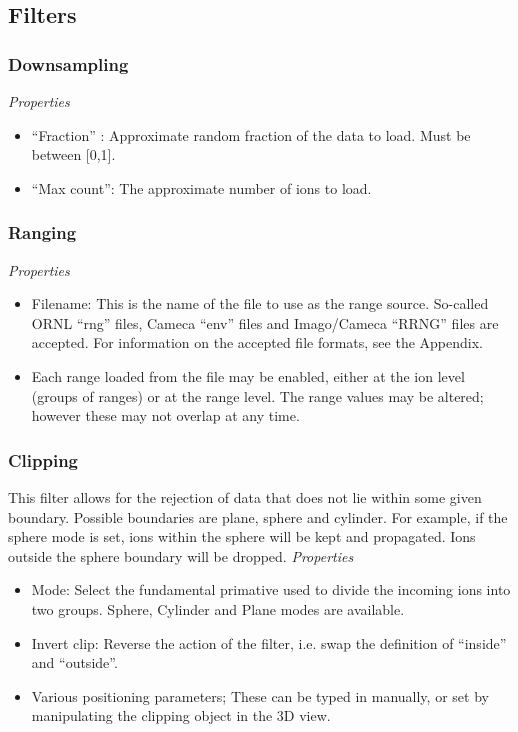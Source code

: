 \documentclass[10pt]{article}
\begin{document}
{\subsection{Filters}
\subsubsection{Downsampling}

\emph{Properties}
\begin{itemize}
\item  ``Fraction'' : Approximate random fraction of the data to load. Must be between [0,1].
\item  ``Max count'': The approximate number of ions to load.

\end{itemize}
 
\subsubsection{Ranging}
 
\emph{Properties}
\begin{itemize}
\item Filename: This is the name of the file to use as the range source. So-called ORNL ``rng'' files, Cameca ``env'' files and Imago/Cameca ``RRNG'' files are accepted. For information on the accepted file formats, see the Appendix.
 
\item Each range loaded from the file may be enabled, either at the ion level (groups of ranges) or at the range level. The range values may be altered; however these may not overlap at any time.

\end{itemize}
 
\subsubsection{Clipping}
This filter allows for the rejection of data that does not lie within some given boundary. Possible boundaries are plane, sphere and cylinder. For example, if the sphere mode is set, ions within the sphere will be kept and propagated. Ions outside the sphere boundary will be dropped. \emph{Properties}
\begin{itemize}
\item  Mode: Select the fundamental primative used to divide the incoming ions into two groups. Sphere, Cylinder and Plane modes are available.
\item  Invert clip: Reverse the action of the filter, i.e. swap the definition of ``inside'' and ``outside''.
\item  Various positioning parameters; These can be typed in manually, or set by manipulating the clipping object in the 3D view.


\end{itemize}}
\end{document}

